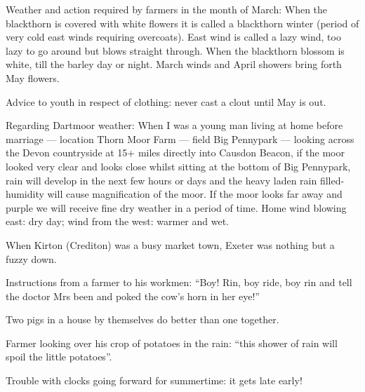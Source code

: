 

Weather and action required by farmers in the month of March: When the
blackthorn is covered with white flowers it is called a blackthorn winter
(period of very cold east winds requiring overcoats).  East wind is called a
lazy wind, too lazy to go around but blows straight through. When the
blackthorn blossom is white, till the barley day or night. March winds and
April showers bring forth May flowers.

\bigskip
\noindent
Advice to youth in respect of clothing: never cast a clout until May is
out.

\bigskip
\noindent
Regarding Dartmoor weather:
When I was a young man living at home before marriage — location Thorn
Moor Farm — field Big Pennypark — looking across the Devon countryside at
15+ miles directly into Causdon Beacon, if the moor looked very clear and
looks close whilst sitting at the bottom of Big Pennypark, rain will
develop in the next few hours or days and the heavy laden rain
filled-humidity will cause magnification of the moor. If the moor looks
far away and purple we will receive fine dry weather in a period of time.
Home wind blowing east: dry day; wind from the west: warmer and wet.

\bigskip
\noindent
When Kirton (Crediton) was a busy market town, Exeter was nothing but a
fuzzy down.

\bigskip
\noindent
Instructions from a farmer to his workmen: ``Boy! Rin, boy ride, boy rin
and tell the doctor Mrs been and poked the cow's horn in her eye!''

\bigskip
\noindent
Two pigs in a house by themselves do better than one together.

\bigskip
\noindent
Farmer looking over his crop of potatoes in the rain: ``this shower of
rain will spoil the little potatoes''.

\bigskip
\noindent
Trouble with clocks going forward for summertime: it gets late early!

\bigskip
\noindent
